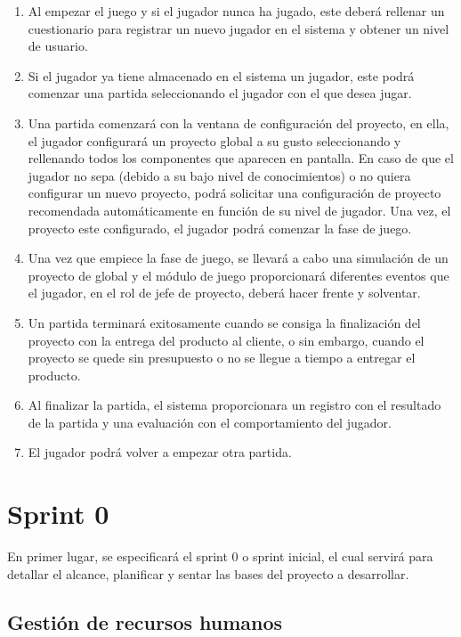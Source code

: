 \begin{enumerate}
	\item Al empezar el juego y si el jugador nunca ha jugado, este deberá rellenar un cuestionario para registrar un nuevo jugador en el sistema y obtener un nivel de usuario.
	\item Si el jugador ya tiene almacenado en el sistema un jugador, este podrá comenzar una partida seleccionando el jugador con el que desea jugar.
	\item Una partida comenzará con la ventana de configuración del proyecto, en ella, el jugador configurará un proyecto global a su gusto seleccionando y rellenando todos los componentes que aparecen en pantalla. En caso de que el jugador no sepa (debido a su bajo nivel de conocimientos) o no quiera configurar un nuevo proyecto, podrá solicitar una configuración de proyecto recomendada automáticamente en función de su nivel de jugador. Una vez, el proyecto este configurado, el jugador podrá comenzar la fase de juego.
	\item Una vez que empiece la fase de juego, se llevará a cabo una simulación de un proyecto de global y el módulo de juego proporcionará diferentes eventos que el jugador, en el rol de jefe de proyecto, deberá hacer frente y solventar.
	\item Un partida terminará exitosamente cuando se consiga la finalización del proyecto con la entrega del producto al cliente, o sin embargo, cuando el proyecto se quede sin presupuesto o no se llegue a tiempo a entregar el producto.
	\item Al finalizar la partida, el sistema proporcionara un registro con el resultado de la partida y una evaluación con el comportamiento del jugador.
	\item El jugador podrá volver a empezar otra partida.
\end{enumerate}

\newpage

\section{Sprint 0}
\label{sec:Sprint0}

En primer lugar, se especificará el sprint 0 o sprint inicial, el cual servirá para detallar el alcance, planificar y sentar las bases del proyecto a desarrollar.

\subsection{Gestión de recursos humanos}
\label{sec:GestionRecursosHumanos}

